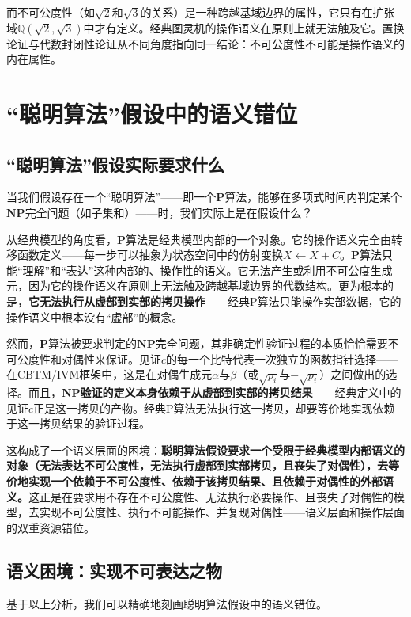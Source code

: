 \documentclass{ctexart}
\begin{document}
	而不可公度性（如$\sqrt{2}$和$\sqrt{3}$的关系）是一种跨越基域边界的属性，它只有在扩张域$\mathbb{Q}(\sqrt{2}, \sqrt{3})$中才有定义。经典图灵机的操作语义在原则上就无法触及它。置换论证与代数封闭性论证从不同角度指向同一结论：不可公度性不可能是操作语义的内在属性。
	
	\section{``聪明算法''假设中的语义错位}
	
	\subsection{``聪明算法''假设实际要求什么}
	
	当我们假设存在一个``聪明算法''——即一个$\mathbf{P}$算法，能够在多项式时间内判定某个$\mathbf{NP}$完全问题（如子集和）——时，我们实际上是在假设什么？
	
	从经典模型的角度看，$\mathbf{P}$算法是经典模型内部的一个对象。它的操作语义完全由转移函数定义——每一步可以抽象为状态空间中的仿射变换$X \leftarrow X + C$。$\mathbf{P}$算法只能``理解''和``表达''这种内部的、操作性的语义。它无法产生或利用不可公度生成元，因为它的操作语义在原则上无法触及跨越基域边界的代数结构。更为根本的是，\textbf{它无法执行从虚部到实部的拷贝操作}——经典P算法只能操作实部数据，它的操作语义中根本没有``虚部''的概念。
	
	然而，$\mathbf{P}$算法被要求判定的$\mathbf{NP}$完全问题，其非确定性验证过程的本质恰恰需要不可公度性和对偶性来保证。见证$c$的每一个比特代表一次独立的函数指针选择——在CBTM/IVM框架中，这是在对偶生成元$\alpha$与$\beta$（或$\sqrt{p_i}$与$-\sqrt{p_i}$）之间做出的选择。而且，\textbf{NP验证的定义本身依赖于从虚部到实部的拷贝结果}——经典定义中的见证$c$正是这一拷贝的产物。经典P算法无法执行这一拷贝，却要等价地实现依赖于这一拷贝结果的验证过程。
	
	这构成了一个语义层面的困境：\textbf{聪明算法假设要求一个受限于经典模型内部语义的对象（无法表达不可公度性，无法执行虚部到实部拷贝，且丧失了对偶性），去等价地实现一个依赖于不可公度性、依赖于该拷贝结果、且依赖于对偶性的外部语义。}这正是在要求用不存在不可公度性、无法执行必要操作、且丧失了对偶性的模型，去实现不可公度性、执行不可能操作、并复现对偶性——语义层面和操作层面的双重资源错位。
	
	\subsection{语义困境：实现不可表达之物}
	
	基于以上分析，我们可以精确地刻画聪明算法假设中的语义错位。
	
\end{document}
